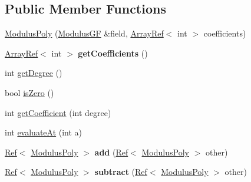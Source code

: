 \subsection*{Public Member Functions}
\begin{DoxyCompactItemize}
\item 
\mbox{\hyperlink{classzxing_1_1pdf417_1_1decoder_1_1ec_1_1_modulus_poly_a718b3223542d24d5fd22ddaeccaef2f1}{Modulus\+Poly}} (\mbox{\hyperlink{classzxing_1_1pdf417_1_1decoder_1_1ec_1_1_modulus_g_f}{Modulus\+GF}} \&field, \mbox{\hyperlink{classzxing_1_1_array_ref}{Array\+Ref}}$<$ int $>$ coefficients)
\item 
\mbox{\label{classzxing_1_1pdf417_1_1decoder_1_1ec_1_1_modulus_poly_ae924a4f9f96debf0a80b76fd01680821}} 
\mbox{\hyperlink{classzxing_1_1_array_ref}{Array\+Ref}}$<$ int $>$ {\bfseries get\+Coefficients} ()
\item 
int \mbox{\hyperlink{classzxing_1_1pdf417_1_1decoder_1_1ec_1_1_modulus_poly_a973687d2aa318d487d66602a6c0fb619}{get\+Degree}} ()
\item 
bool \mbox{\hyperlink{classzxing_1_1pdf417_1_1decoder_1_1ec_1_1_modulus_poly_ab237996b24f6f3a14ec010ae1ace1774}{is\+Zero}} ()
\item 
int \mbox{\hyperlink{classzxing_1_1pdf417_1_1decoder_1_1ec_1_1_modulus_poly_a448c5b5be46257827cd9abd8fccce05d}{get\+Coefficient}} (int degree)
\item 
int \mbox{\hyperlink{classzxing_1_1pdf417_1_1decoder_1_1ec_1_1_modulus_poly_a29852c1118d4078cb3c89f5a716e7c85}{evaluate\+At}} (int a)
\item 
\mbox{\label{classzxing_1_1pdf417_1_1decoder_1_1ec_1_1_modulus_poly_a730477be9845fee6d77c24cdbaa3ff6b}} 
\mbox{\hyperlink{classzxing_1_1_ref}{Ref}}$<$ \mbox{\hyperlink{classzxing_1_1pdf417_1_1decoder_1_1ec_1_1_modulus_poly}{Modulus\+Poly}} $>$ {\bfseries add} (\mbox{\hyperlink{classzxing_1_1_ref}{Ref}}$<$ \mbox{\hyperlink{classzxing_1_1pdf417_1_1decoder_1_1ec_1_1_modulus_poly}{Modulus\+Poly}} $>$ other)
\item 
\mbox{\label{classzxing_1_1pdf417_1_1decoder_1_1ec_1_1_modulus_poly_a4706d0956be78ad1801380fd314a4936}} 
\mbox{\hyperlink{classzxing_1_1_ref}{Ref}}$<$ \mbox{\hyperlink{classzxing_1_1pdf417_1_1decoder_1_1ec_1_1_modulus_poly}{Modulus\+Poly}} $>$ {\bfseries subtract} (\mbox{\hyperlink{classzxing_1_1_ref}{Ref}}$<$ \mbox{\hyperlink{classzxing_1_1pdf417_1_1decoder_1_1ec_1_1_modulus_poly}{Modulus\+Poly}} $>$ other)

\end{DoxyCompactItemize}
